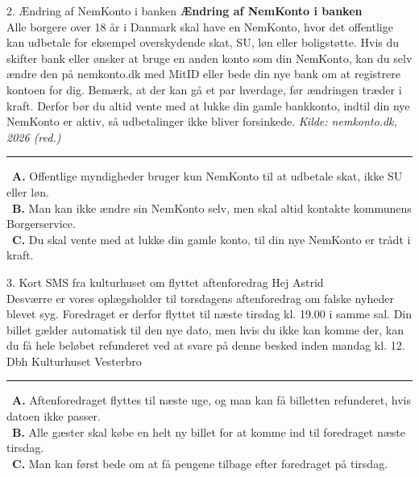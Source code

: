 \begin{emailbox}{2. Ændring af NemKonto i banken}
\textbf{Ændring af NemKonto i banken}\\
Alle borgere over 18 år i Danmark skal have en NemKonto, hvor det offentlige kan udbetale for eksempel overskydende skat, SU, løn eller boligstøtte. Hvis du skifter bank eller ønsker at bruge en anden konto som din NemKonto, kan du selv ændre den på nemkonto.dk med MitID eller bede din nye bank om at registrere kontoen for dig. Bemærk, at der kan gå et par hverdage, før ændringen træder i kraft. Derfor bør du altid vente med at lukke din gamle bankkonto, indtil din nye NemKonto er aktiv, så udbetalinger ikke bliver forsinkede.
\hfill {\small\textit{Kilde: nemkonto.dk, 2026 (red.)}}

\vspace{0.3em}
\hrule
\vspace{0.3em}
\small
\fbox{\phantom{X}}\ \textbf{A.} Offentlige myndigheder bruger kun NemKonto til at udbetale skat, ikke SU eller løn.\\[0.25em]
\fbox{\phantom{X}}\ \textbf{B.} Man kan ikke ændre sin NemKonto selv, men skal altid kontakte kommunens Borgerservice.\\[0.25em]
\fbox{\phantom{X}}\ \textbf{C.} Du skal vente med at lukke din gamle konto, til din nye NemKonto er trådt i kraft.
\end{emailbox}

\begin{emailbox}{3. Kort SMS fra kulturhuset om flyttet aftenforedrag}
Hej Astrid\\
Desværre er vores oplægsholder til torsdagens aftenforedrag om falske nyheder blevet syg. Foredraget er derfor flyttet til næste tirsdag kl. 19.00 i samme sal. Din billet gælder automatisk til den nye dato, men hvis du ikke kan komme der, kan du få hele beløbet refunderet ved at svare på denne besked inden mandag kl. 12.\\
Dbh Kulturhuset Vesterbro

\vspace{0.3em}
\hrule
\vspace{0.3em}
\small
\fbox{\phantom{X}}\ \textbf{A.} Aftenforedraget flyttes til næste uge, og man kan få billetten refunderet, hvis datoen ikke passer.\\[0.25em]
\fbox{\phantom{X}}\ \textbf{B.} Alle gæster skal købe en helt ny billet for at komme ind til foredraget næste tirsdag.\\[0.25em]
\fbox{\phantom{X}}\ \textbf{C.} Man kan først bede om at få pengene tilbage efter foredraget på tirsdag.
\end{emailbox}

